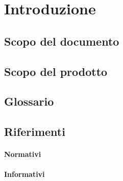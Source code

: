 \section{Introduzione}
	\subsection{Scopo del documento}
	\subsection{Scopo del prodotto}
	\subsection{Glossario}
	\subsection{Riferimenti}
		\paragraph{Normativi}
		\paragraph{Informativi}
